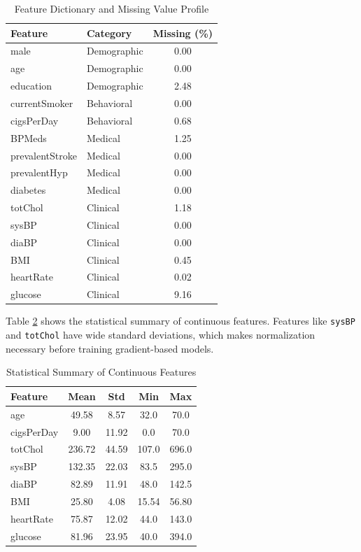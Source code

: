 \documentclass[conference]{IEEEtran}
\begin{document}
\begin{table}[htbp]
\caption{Feature Dictionary and Missing Value Profile}
\begin{center}
\begin{tabular}{llc}
\toprule
\textbf{Feature} & \textbf{Category} & \textbf{Missing (\%)} \\
\midrule
male & Demographic & 0.00 \\
age & Demographic & 0.00 \\
education & Demographic & 2.48 \\
currentSmoker & Behavioral & 0.00 \\
cigsPerDay & Behavioral & 0.68 \\
BPMeds & Medical & 1.25 \\
prevalentStroke & Medical & 0.00 \\
prevalentHyp & Medical & 0.00 \\
diabetes & Medical & 0.00 \\
totChol & Clinical & 1.18 \\
sysBP & Clinical & 0.00 \\
diaBP & Clinical & 0.00 \\
BMI & Clinical & 0.45 \\
heartRate & Clinical & 0.02 \\
glucose & Clinical & 9.16 \\
\bottomrule
\end{tabular}
\label{tab:features}
\end{center}
\end{table}

Table \ref{tab:stats} shows the statistical summary of continuous features. Features like \texttt{sysBP} and \texttt{totChol} have wide standard deviations, which makes normalization necessary before training gradient-based models.

\begin{table}[htbp]
\caption{Statistical Summary of Continuous Features}
\begin{center}
\begin{tabular}{lcccc}
\toprule
\textbf{Feature} & \textbf{Mean} & \textbf{Std} & \textbf{Min} & \textbf{Max} \\
\midrule
age & 49.58 & 8.57 & 32.0 & 70.0 \\
cigsPerDay & 9.00 & 11.92 & 0.0 & 70.0 \\
totChol & 236.72 & 44.59 & 107.0 & 696.0 \\
sysBP & 132.35 & 22.03 & 83.5 & 295.0 \\
diaBP & 82.89 & 11.91 & 48.0 & 142.5 \\
BMI & 25.80 & 4.08 & 15.54 & 56.80 \\
heartRate & 75.87 & 12.02 & 44.0 & 143.0 \\
glucose & 81.96 & 23.95 & 40.0 & 394.0 \\
\bottomrule
\end{tabular}
\label{tab:stats}
\end{center}
\end{table}
\end{document}

